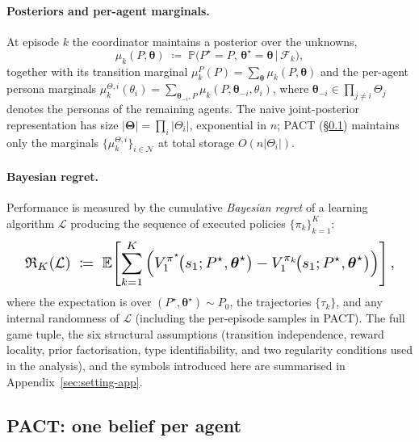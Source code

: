 \documentclass{article}
\begin{document}
\paragraph{Posteriors and per-agent marginals.} At episode $k$ the coordinator maintains a posterior over the unknowns,
\begin{equation*}
\mu_k(P,\boldsymbol\theta)\;\coloneqq\;\mathbb P\!\big(P^\star{=}P,\,\boldsymbol\theta^\star{=}\boldsymbol\theta\,\big|\,\mathcal F_k\big),
\end{equation*}
together with its transition marginal $\mu_k^P(P)=\sum_{\boldsymbol\theta}\mu_k(P,\boldsymbol\theta)$ and the per-agent persona marginals $\mu_k^{\Theta,i}(\theta_i)=\sum_{\boldsymbol\theta_{-i},P}\mu_k(P,\boldsymbol\theta_{-i},\theta_i)$, where $\boldsymbol\theta_{-i}\!\in\!\prod_{j\neq i}\Theta_j$ denotes the personas of the remaining agents. The naive joint-posterior representation has size $|\boldsymbol\Theta|=\prod_i|\Theta_i|$, exponential in $n$; PACT (\S\ref{sec:pact-vanilla}) maintains only the marginals $\{\mu_k^{\Theta,i}\}_{i\in\mathcal N}$ at total storage $O(n|\Theta_i|)$.

\paragraph{Bayesian regret.} Performance is measured by the cumulative \emph{Bayesian regret} of a learning algorithm $\mathcal L$ producing the sequence of executed policies $\{\pi_k\}_{k=1}^K$:
\begin{equation}
\label{eq:bayes-regret-main}
\resizebox{0.95\linewidth}{!}{$\displaystyle
\mathfrak R_K(\mathcal L)\;\coloneqq\;\mathbb E\!\left[\sum_{k=1}^{K}\Big(V^{\pi^\star}_1\!\big(s_1;P^\star,\boldsymbol\theta^\star\big)-V^{\pi_k}_1\!\big(s_1;P^\star,\boldsymbol\theta^\star\big)\Big)\right],
$}
\end{equation}
where the expectation is over $(P^\star,\boldsymbol\theta^\star)\!\sim\!P_0$, the trajectories $\{\tau_k\}$, and any internal randomness of $\mathcal L$ (including the per-episode samples in PACT). The full game tuple, the six structural assumptions (transition independence, reward locality, prior factorisation, type identifiability, and two regularity conditions used in the analysis), and the symbols introduced here are summarised in Appendix~\ref{sec:setting-app}.

\subsection{PACT: one belief per agent}
\label{sec:pact-vanilla}
\end{document}
